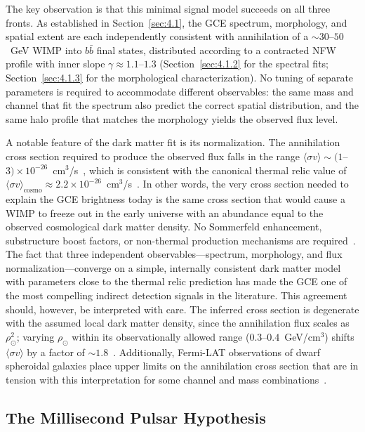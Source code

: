 The key observation is that this minimal signal model succeeds on all three fronts.
As established in Section~\ref{sec:4.1}, the GCE spectrum, morphology, and spatial extent are each independently consistent with annihilation of a $\sim 30$--$50$~GeV WIMP into $b\bar{b}$ final states, distributed according to a contracted NFW profile with inner slope $\gamma \approx 1.1$--$1.3$ (Section~\ref{sec:4.1.2} for the spectral fits; Section~\ref{sec:4.1.3} for the morphological characterization).
No tuning of separate parameters is required to accommodate different observables: the same mass and channel that fit the spectrum also predict the correct spatial distribution, and the same halo profile that matches the morphology yields the observed flux level.

A notable feature of the dark matter fit is its normalization.
The annihilation cross section required to produce the observed flux falls in the range $\langle \sigma v \rangle \sim (1$--$3) \times 10^{-26}$~cm$^3$/s~\cite{Daylan:2014rsa, Calore:2014xka}, which is consistent with the canonical thermal relic value of $\langle \sigma v \rangle_{\mathrm{cosmo}} \approx 2.2 \times 10^{-26}$~cm$^3$/s~\cite{Cirelli:2024ssz}.
In other words, the very cross section needed to explain the GCE brightness today is the same cross section that would cause a WIMP to freeze out in the early universe with an abundance equal to the observed cosmological dark matter density.
No Sommerfeld enhancement, substructure boost factors, or non-thermal production mechanisms are required~\cite{Daylan:2014rsa}.
The fact that three independent observables---spectrum, morphology, and flux normalization---converge on a simple, internally consistent dark matter model with parameters close to the thermal relic prediction has made the GCE one of the most compelling indirect detection signals in the literature.
This agreement should, however, be interpreted with care.
The inferred cross section is degenerate with the assumed local dark matter density, since the annihilation flux scales as $\rho_\odot^2$; varying $\rho_\odot$ within its observationally allowed range ($0.3$--$0.4$~GeV/cm$^3$) shifts $\langle \sigma v \rangle$ by a factor of $\sim 1.8$~\cite{Abazajian:2014fta, Daylan:2014rsa}.
Additionally, Fermi-LAT observations of dwarf spheroidal galaxies place upper limits on the annihilation cross section that are in tension with this interpretation for some channel and mass combinations~\cite{Fermi-LAT:2015att}.

\subsection{The Millisecond Pulsar Hypothesis}
\label{sec:4.2.2}

